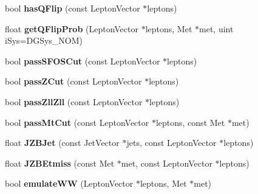 \begin{DoxyCompactItemize}
\item 
\hypertarget{classSusySelection_a17707c06d4931380a0dd8dbe75547711}{
bool {\bfseries hasQFlip} (const LeptonVector $\ast$leptons)}
\label{classSusySelection_a17707c06d4931380a0dd8dbe75547711}

\item 
\hypertarget{classSusySelection_aaeca9dce95b5f728b5d1c58474616082}{
float {\bfseries getQFlipProb} (LeptonVector $\ast$leptons, Met $\ast$met, uint iSys=DGSys\_\-NOM)}
\label{classSusySelection_aaeca9dce95b5f728b5d1c58474616082}

\item 
\hypertarget{classSusySelection_a6cba3254d008ffe1be4cf6c85a02d779}{
bool {\bfseries passSFOSCut} (const LeptonVector $\ast$leptons)}
\label{classSusySelection_a6cba3254d008ffe1be4cf6c85a02d779}

\item 
\hypertarget{classSusySelection_a46b6f21683b076e328a97eddc168cfc4}{
bool {\bfseries passZCut} (const LeptonVector $\ast$leptons)}
\label{classSusySelection_a46b6f21683b076e328a97eddc168cfc4}

\item 
\hypertarget{classSusySelection_a5fab6541be2450d036e230ed9741c78d}{
bool {\bfseries passZllZll} (const LeptonVector $\ast$leptons)}
\label{classSusySelection_a5fab6541be2450d036e230ed9741c78d}

\item 
\hypertarget{classSusySelection_a5fd34dcaf46ceb590c078bdd11c53b82}{
bool {\bfseries passMtCut} (const LeptonVector $\ast$leptons, const Met $\ast$met)}
\label{classSusySelection_a5fd34dcaf46ceb590c078bdd11c53b82}

\item 
\hypertarget{classSusySelection_ac25cafa9caa25b0ee586184f339997e6}{
float {\bfseries JZBJet} (const JetVector $\ast$jets, const LeptonVector $\ast$leptons)}
\label{classSusySelection_ac25cafa9caa25b0ee586184f339997e6}

\item 
\hypertarget{classSusySelection_aaeb5211e87042d218f2ce6a12da8f6aa}{
float {\bfseries JZBEtmiss} (const Met $\ast$met, const LeptonVector $\ast$leptons)}
\label{classSusySelection_aaeb5211e87042d218f2ce6a12da8f6aa}

\item 
\hypertarget{classSusySelection_a8af22548147dca3cf8f52ee63c9490de}{
bool {\bfseries emulateWW} (LeptonVector $\ast$leptons, Met $\ast$met)}
\label{classSusySelection_a8af22548147dca3cf8f52ee63c9490de}


\end{DoxyCompactItemize}
